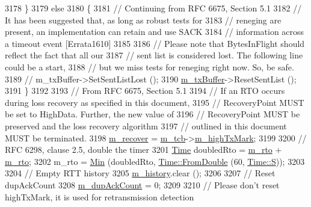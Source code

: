 \begin{DoxyCode}
3178     \}
3179   \textcolor{keywordflow}{else}
3180     \{
3181       \textcolor{comment}{// Continuing from RFC 6675, Section 5.1}
3182       \textcolor{comment}{// It has been suggested that, as long as robust tests for}
3183       \textcolor{comment}{// reneging are present, an implementation can retain and use SACK}
3184       \textcolor{comment}{// information across a timeout event [Errata1610]}
3185 
3186       \textcolor{comment}{// Please note that BytesInFlight should reflect the fact that all our}
3187       \textcolor{comment}{// sent list is considered lost. The following line could be a start,}
3188       \textcolor{comment}{// but we miss tests for reneging right now. So, be safe.}
3189       \textcolor{comment}{// m\_txBuffer->SetSentListLost ();}
3190       \hyperlink{classns3_1_1TcpSocketBase_a4a1b53982ffd851bd07ab8d5005c130e}{m\_txBuffer}->ResetSentList ();
3191     \}
3192 
3193   \textcolor{comment}{// From RFC 6675, Section 5.1}
3194   \textcolor{comment}{// If an RTO occurs during loss recovery as specified in this document,}
3195   \textcolor{comment}{// RecoveryPoint MUST be set to HighData.  Further, the new value of}
3196   \textcolor{comment}{// RecoveryPoint MUST be preserved and the loss recovery algorithm}
3197   \textcolor{comment}{// outlined in this document MUST be terminated.}
3198   \hyperlink{classns3_1_1TcpSocketBase_a176f84edf4bba543e7e3457881f6660f}{m\_recover} = \hyperlink{classns3_1_1TcpSocketBase_a26bbaf59001308dc43fb630d76f2e38b}{m\_tcb}->\hyperlink{classns3_1_1TcpSocketState_a2c46f51fd8e2bf43b564ea838b43b8bb}{m\_highTxMark};
3199 
3200   \textcolor{comment}{// RFC 6298, clause 2.5, double the timer}
3201   \hyperlink{namespacens3_1_1TracedValueCallback_a7ffd3e7c142ffe7c8a1d2db9b8de38ec}{Time} doubledRto = \hyperlink{classns3_1_1TcpSocketBase_a47788384a59ae230896377ceab6829d4}{m\_rto} + \hyperlink{classns3_1_1TcpSocketBase_a47788384a59ae230896377ceab6829d4}{m\_rto};
3202   m\_rto = \hyperlink{group__highprec_gacb0b89d5f4363bf77747ff1212f27430}{Min} (doubledRto, \hyperlink{classns3_1_1Time_a60e845f4a74e62495b86356afe604cb4}{Time::FromDouble} (60,  \hyperlink{classns3_1_1Time_a87a7f4d29c68b047a72d291ad660295aade8622b06524a328cd3a59db6ccf76af}{Time::S}));
3203 
3204   \textcolor{comment}{// Empty RTT history}
3205   \hyperlink{classns3_1_1TcpSocketBase_a6d6853c108db3acb5b43ee855bd1f805}{m\_history}.clear ();
3206 
3207   \textcolor{comment}{// Reset dupAckCount}
3208   \hyperlink{classns3_1_1TcpSocketBase_a4cf1d54115a5b2c8db34b62b6ccfa541}{m\_dupAckCount} = 0;
3209 
3210   \textcolor{comment}{// Please don't reset highTxMark, it is used for retransmission detection}

\end{DoxyCode}
